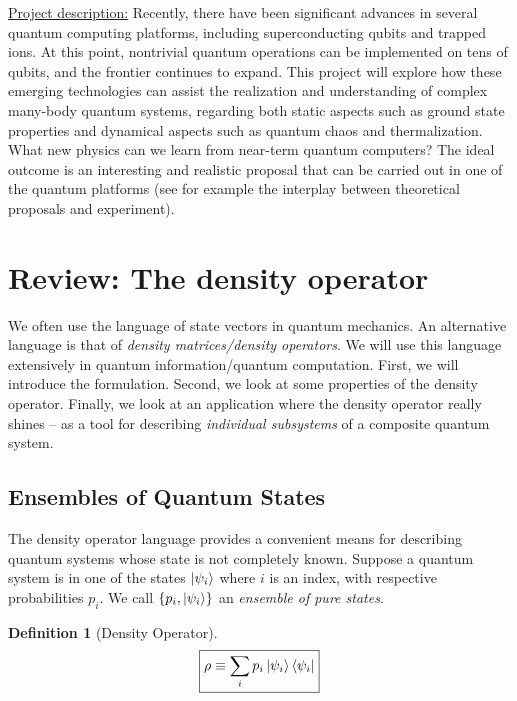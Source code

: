 \documentclass{book}
\theoremstyle{definition}
\newtheorem{defn}{Definition}[section]
\begin{document}
\underline{Project description:} Recently, there have been significant advances in several quantum computing platforms, including superconducting qubits and trapped ions. At this point, nontrivial quantum operations can be implemented
on tens of qubits, and the frontier continues to expand. This project will explore how these emerging
technologies can assist the realization and understanding of complex many-body quantum systems,
regarding both static aspects such as ground state properties and dynamical aspects such as quantum chaos
and thermalization. What new physics can we learn from near-term quantum computers? The ideal
outcome is an interesting and realistic proposal that can be carried out in one of the quantum platforms (see
for example the interplay between theoretical proposals and experiment).














\newpage


\section{Review: The density operator}


We often use the language of state vectors in quantum mechanics. An alternative language is that of \textit{density matrices/density operators}. We will use this language extensively in quantum information/quantum computation. First, we will introduce the formulation. Second, we look at some properties of the density operator. Finally, we look at an application where the density operator really shines -- as a tool for describing \textit{individual subsystems} of a composite quantum system.  


\subsection{Ensembles of Quantum States}

The density operator language provides a convenient means for describing quantum systems whose state is not completely known. Suppose a quantum system is in one of the states $\ket{\psi_i}$ where $i$ is an index, with respective probabilities $p_i$. We call $\{p_i, \ket{\psi_i}\}$ an \textit{ensemble of pure states}. \\

\begin{defn}[Density Operator]
	\begin{align}
	\boxed{\rho \equiv \sum_i p_i \ket{\psi_i}\bra{\psi_i}}
	\end{align}
\end{defn}
\end{document}
